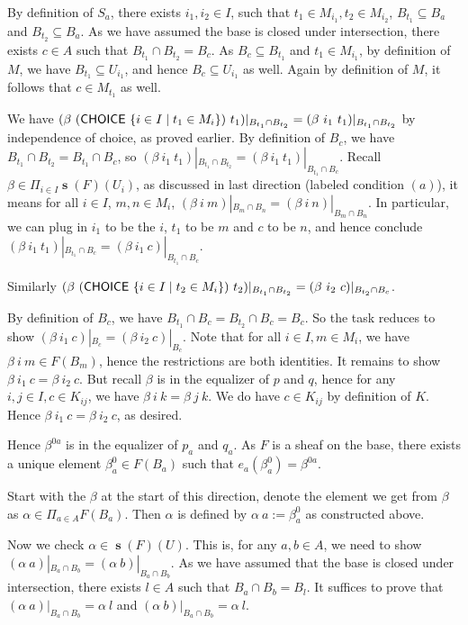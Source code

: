 \documentclass[a4paper]{article}
\DeclareMathOperator{\s}{\mathbf s}
\DeclareMathOperator{\CHOICE}{\sf CHOICE}
\begin{document}
By definition of $S_a$, there exists $i_1,i_2\in I$, such that $t_1\in M_{i_1},t_2\in M_{i_2}$, $B_{t_1}\subseteq B_a$ and $B_{t_2}\subseteq B_a$. As we have assumed the base is closed under intersection, there exists $c\in A$ such that $B_{t_1}\cap B_{t_2}=B_c$. As $B_c\subseteq B_{t_1}$ and $t_1\in M_{i_1}$, by definition of $M$, we have $B_{t_1}\subseteq U_{i_1}$, and hence $B_c\subseteq U_{i_1}$ as well. Again by definition of $M$, it follows that $c\in M_{t_1}$ as well. 

We have $(\beta\ (\CHOICE \ \{i\in I\mid t_1\in M_i\}) \ t_1)|_{B_{t_1}\cap B_{t_2}} = (\beta\ i_1 \ t_1)|_{B_{t_1}\cap B_{t_2}}$ by independence of choice, as proved earlier. By definition of $B_c$, we have $B_{t_1}\cap B_{t_2}=B_{t_1}\cap B_c$, so $(\beta\ i_1 \ t_1)|_{B_{t_1}\cap B_{t_2}} = (\beta\ i_1 \ t_1)|_{B_{t_1}\cap B_{c}}$. Recall $\beta\in \Pi_{i\in I}\s(F)(U_i)$, as discussed in last direction (labeled condition $(a)$), it means for all $i\in I$, $m,n\in M_i$, $(\beta \ i \ m)|_{B_m\cap B_n}= (\beta \ i \ n)|_{B_m\cap B_n}$. In particular, we can plug in $i_1$ to be the $i$, $t_1$ to be $m$ and $c$ to be $n$, and hence conclude $(\beta\ i_1 \ t_1)|_{B_{t_1}\cap B_{c}} = (\beta\ i_1 \ c)|_{B_{t_1}\cap B_{c}}$. 

Similarly $(\beta \ (\CHOICE \ \{i\in I\mid t_2\in M_i\}) \ t_2)|_{B_{t_1}\cap B_{t_2}} = (\beta \ i_2 \ c)|_{B_{t_2}\cap B_c}$. 

By definition of $B_c$, we have $B_{t_1}\cap B_c=B_{t_2}\cap B_c = B_c$. So the task reduces to show $(\beta \ i_1 \ c)|_{B_c} = (\beta \ i_2 \ c)|_{B_c}$. Note that for all $i\in I, m\in M_i$, we have $\beta \ i \ m \in F(B_m)$, hence the restrictions are both identities. It remains to show $\beta \ i_1 \ c = \beta \ i_2 \ c$. But recall $\beta$ is in the equalizer of $p$ and $q$, hence for any $i,j\in I, c\in K_{ij}$, we have $\beta \ i \ k = \beta \ j \ k$. We do have $c\in K_{ij}$ by definition of $K$. Hence $\beta \ i_1 \ c = \beta \ i_2 \ c$, as desired.

Hence $\beta^{0a}$ is in the equalizer of $p_a$ and $q_a$. As $F$ is a sheaf on the base, there exists a unique element $\beta^0_a\in F(B_a)$ such that $e_a(\beta^0_a)=\beta^{0a}$. 

Start with the $\beta$ at the start of this direction, denote the element we get from $\beta$ as $\alpha\in \Pi_{a\in A}F(B_a)$. Then $\alpha$ is defined by $\alpha \ a :=\beta^0_a$ as constructed above.

Now we check $\alpha\in \s(F)(U)$. This is, for any $a,b\in A$, we need to show $(\alpha \ a)|_{B_a\cap B_b}=(\alpha \ b)|_{B_a\cap B_b}$. As we have assumed that the base is closed under intersection, there exists $l\in A$ such that $B_a\cap B_b=B_l$. It suffices to prove that $(\alpha \ a)|_{B_a\cap B_b}= \alpha \ l$ and $(\alpha \ b)|_{B_a\cap B_b}= \alpha \ l$.
\end{document}
